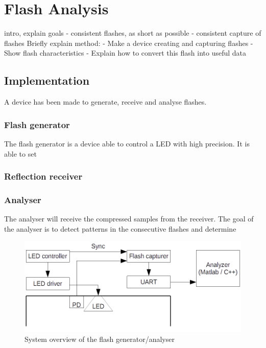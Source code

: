 \chapter{Flash Analysis}
\label{chp:Flash_Analysis}
intro, explain goals
	- consistent flashes, as short as possible
	- consistent capture of flashes
Briefly explain method:
	- Make a device creating and capturing flashes
	- Show flash characteristics
	- Explain how to convert this flash into useful data

\section{Implementation}
\label{sec:Implementation}
A device has been made to generate, receive and analyse flashes. 

\subsection{Flash generator}
The flash generator is a device able to control a LED with high precision. It is able to set

\subsection{Reflection receiver}

\subsection{Analyser}
The analyser will receive the compressed samples from the receiver. The goal of the analyser is to detect patterns in the consecutive flashes and determine

\begin{figure}[!h]
	\includegraphics[width=\textwidth]{pics/systemOverview.png}
	\caption{System overview of the flash generator/analyser}
	\label{fig:systemOveriew}
\end{figure}

